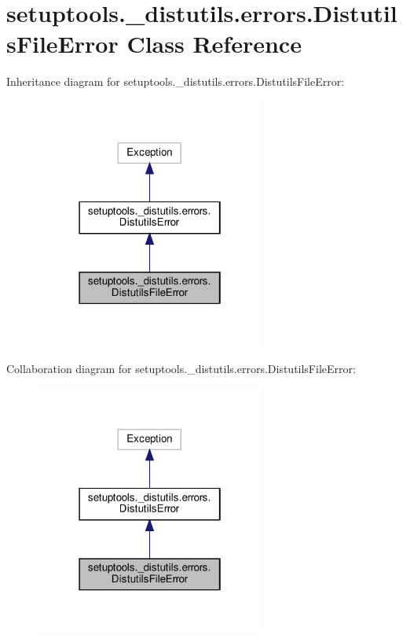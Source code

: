 \hypertarget{classsetuptools_1_1__distutils_1_1errors_1_1DistutilsFileError}{}\section{setuptools.\+\_\+distutils.\+errors.\+Distutils\+File\+Error Class Reference}
\label{classsetuptools_1_1__distutils_1_1errors_1_1DistutilsFileError}


Inheritance diagram for setuptools.\+\_\+distutils.\+errors.\+Distutils\+File\+Error\+:
\nopagebreak
\begin{figure}[H]
\begin{center}
\leavevmode
\includegraphics[width=214pt]{classsetuptools_1_1__distutils_1_1errors_1_1DistutilsFileError__inherit__graph}
\end{center}
\end{figure}


Collaboration diagram for setuptools.\+\_\+distutils.\+errors.\+Distutils\+File\+Error\+:
\nopagebreak
\begin{figure}[H]
\begin{center}
\leavevmode
\includegraphics[width=214pt]{classsetuptools_1_1__distutils_1_1errors_1_1DistutilsFileError__coll__graph}
\end{center}
\end{figure}


